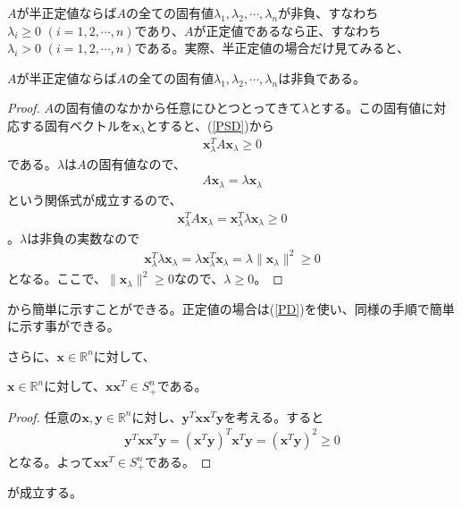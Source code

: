 $A$が半正定値ならば$A$の全ての固有値$\lambda_1, \lambda_2, \cdots, \lambda_n$が非負、すなわち$\lambda_i \geq 0 \,\, (i = 1, 2, \cdots, n)$であり、$A$が正定値であるなら正、すなわち$\lambda_i > 0 \,\, (i = 1, 2, \cdots, n)$である。実際、半正定値の場合だけ見てみると、
\begin{theorem*}
  $A$が半正定値ならば$A$の全ての固有値$\lambda_1, \lambda_2, \cdots, \lambda_n$は非負である。
\end{theorem*}
\begin{proof}
  $A$の固有値のなかから任意にひとつとってきて$\lambda$とする。この固有値に対応する固有ベクトルを$\mathbf{x}_\lambda$とすると、(\ref{PSD})から
  \begin{align*}
    \mathbf{x}_\lambda^T A \mathbf{x}_\lambda \geq 0
  \end{align*}
  である。$\lambda$は$A$の固有値なので、
  \begin{align*}
    A \mathbf{x}_\lambda = \lambda \mathbf{x}_\lambda
  \end{align*}
  という関係式が成立するので、
  \begin{align*}
    \mathbf{x}_\lambda^T A \mathbf{x}_\lambda = \mathbf{x}_\lambda^T \lambda \mathbf{x}_\lambda \geq 0
  \end{align*}
  。$\lambda$は非負の実数なので
  \begin{align*}
    \mathbf{x}_\lambda^T \lambda \mathbf{x}_\lambda = \lambda \mathbf{x}_\lambda^T \mathbf{x}_\lambda = \lambda \|\mathbf{x}_\lambda\|^2 \geq 0
  \end{align*}
  となる。ここで、$\|\mathbf{x}_\lambda\|^2 \geq 0$なので、$\lambda \geq 0$。
\end{proof}
から簡単に示すことができる。正定値の場合は(\ref{PD})を使い、同様の手順で簡単に示す事ができる。

さらに、$\mathbf{x} \in \mathbb{R}^n$に対して、
\begin{theorem} \label{PsdMatrix}
  $\mathbf{x} \in \mathbb{R}^n$に対して、$\mathbf{x} \mathbf{x}^T \in S_+^n$である。
\end{theorem}
\begin{proof}
  任意の$\mathbf{x}, \mathbf{y} \in \mathbb{R}^n$に対し、$\mathbf{y}^T \mathbf{x} \mathbf{x}^T \mathbf{y}$を考える。すると
  \begin{align*}
    \mathbf{y}^T \mathbf{x} \mathbf{x}^T \mathbf{y} = (\mathbf{x}^T \mathbf{y})^T \mathbf{x}^T \mathbf{y} = \left(\mathbf{x}^T \mathbf{y}\right)^2 \geq 0
  \end{align*}
  となる。よって$\mathbf{x} \mathbf{x}^T \in S_+^n$である。
\end{proof}
が成立する。

